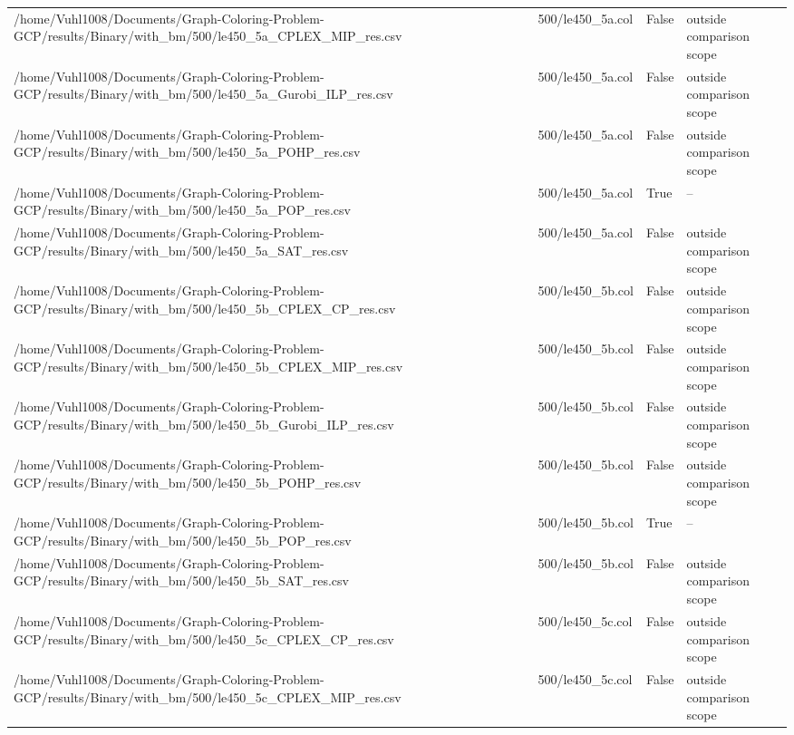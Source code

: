 \begin{table}[htbp]
\begin{tabular}{llll}
/home/Vuhl1008/Documents/Graph-Coloring-Problem-GCP/results/Binary/with\_bm/500/le450\_5a\_CPLEX\_MIP\_res.csv & 500/le450\_5a.col & False & outside comparison scope \\
/home/Vuhl1008/Documents/Graph-Coloring-Problem-GCP/results/Binary/with\_bm/500/le450\_5a\_Gurobi\_ILP\_res.csv & 500/le450\_5a.col & False & outside comparison scope \\
/home/Vuhl1008/Documents/Graph-Coloring-Problem-GCP/results/Binary/with\_bm/500/le450\_5a\_POHP\_res.csv & 500/le450\_5a.col & False & outside comparison scope \\
/home/Vuhl1008/Documents/Graph-Coloring-Problem-GCP/results/Binary/with\_bm/500/le450\_5a\_POP\_res.csv & 500/le450\_5a.col & True & -- \\
/home/Vuhl1008/Documents/Graph-Coloring-Problem-GCP/results/Binary/with\_bm/500/le450\_5a\_SAT\_res.csv & 500/le450\_5a.col & False & outside comparison scope \\
/home/Vuhl1008/Documents/Graph-Coloring-Problem-GCP/results/Binary/with\_bm/500/le450\_5b\_CPLEX\_CP\_res.csv & 500/le450\_5b.col & False & outside comparison scope \\
/home/Vuhl1008/Documents/Graph-Coloring-Problem-GCP/results/Binary/with\_bm/500/le450\_5b\_CPLEX\_MIP\_res.csv & 500/le450\_5b.col & False & outside comparison scope \\
/home/Vuhl1008/Documents/Graph-Coloring-Problem-GCP/results/Binary/with\_bm/500/le450\_5b\_Gurobi\_ILP\_res.csv & 500/le450\_5b.col & False & outside comparison scope \\
/home/Vuhl1008/Documents/Graph-Coloring-Problem-GCP/results/Binary/with\_bm/500/le450\_5b\_POHP\_res.csv & 500/le450\_5b.col & False & outside comparison scope \\
/home/Vuhl1008/Documents/Graph-Coloring-Problem-GCP/results/Binary/with\_bm/500/le450\_5b\_POP\_res.csv & 500/le450\_5b.col & True & -- \\
/home/Vuhl1008/Documents/Graph-Coloring-Problem-GCP/results/Binary/with\_bm/500/le450\_5b\_SAT\_res.csv & 500/le450\_5b.col & False & outside comparison scope \\
/home/Vuhl1008/Documents/Graph-Coloring-Problem-GCP/results/Binary/with\_bm/500/le450\_5c\_CPLEX\_CP\_res.csv & 500/le450\_5c.col & False & outside comparison scope \\
/home/Vuhl1008/Documents/Graph-Coloring-Problem-GCP/results/Binary/with\_bm/500/le450\_5c\_CPLEX\_MIP\_res.csv & 500/le450\_5c.col & False & outside comparison scope \\

\end{tabular}
\end{table}
